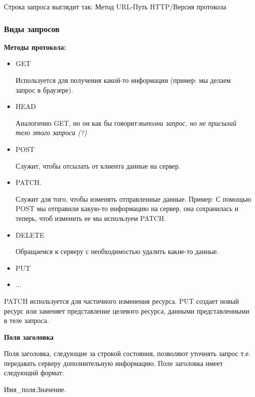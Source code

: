 \documentclass[a4paper,12pt]{article}
\begin{document}
	Строка запроса выглядит так:
	Метод URL-Путь HTTP/Версия протокола
	
	\subsubsection{Виды запросов}
	
	{\bf Методы протокола:}
	\begin{itemize}
		\item GET
		
		Используется для получения какой-то информации (пример: мы делаем запрос в браузере).
		\item HEAD
		
		Аналогично GET, но он как бы говорит:\textit{выполни запрос, но не присылай тело этого запроса (?)}
		\item POST
		
		Служит, чтобы отсылать от клиента данные на сервер.
		\item PATCH.
		
		Служит для того, чтобы изменять отправленные данные.
		Пример: С помощью POST мы отправили какую-то информацию на сервер, она сохранилась и теперь, чтоб изменить ее мы используем PATCH.
		\item DELETE
		
		Обращаемся к серверу с необходимостью удалить какие-то данные.
		
		\item PUT
		
		\item ...
	\end{itemize}

	PATCH используется для частичного изменения ресурса. PUT создает новый ресурс или заменяет представление целевого ресурса, данными представленными в теле запроса.

	{\bf Поля заголовка}
	
	Поля заголовка, следующие за строкой состояния, позволяют уточнять запрос т.е. передавать серверу дополнительную информацию. Поле заголовка имеет следующий формат:
	
	Имя\_поля:Значение.
	
\end{document}
